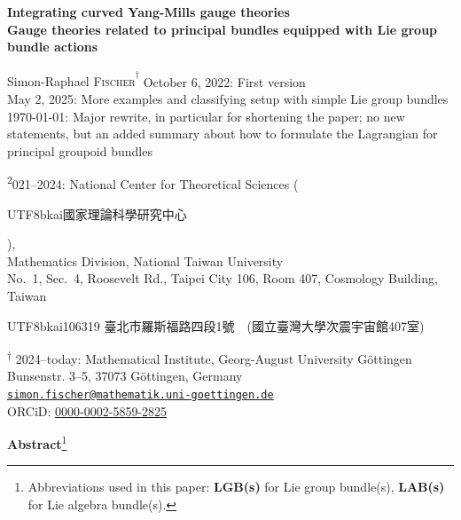 \documentclass[reqno,a4paper,oneside]{amsart}
\theoremstyle{plain}
\theoremstyle{remark}
\theoremstyle{definition}
\begin{document}
    \begin{titlepage}
        \vspace*{2cm}
        \begin{center}
            {{\LARGE \bf
                Integrating curved Yang-Mills gauge theories}
								\\[0.2cm]
								\bf Gauge theories related to principal bundles equipped with Lie group bundle actions
            }
            \vskip1cm
            {
						{\Large {Simon-Raphael \textsc{Fischer}\textsuperscript*\textsuperscript{$\dagger$}}}
						\vskip0.5cm
						October 6, 2022: First version \\ May 2, 2025: More examples and classifying setup with simple Lie group bundles \\ \today: Major rewrite, in particular for shortening the paper; no new statements, but an added summary about how to formulate the Lagrangian for principal groupoid bundles
            \vskip0.5cm
            {
                \textsuperscript* 2021–2024: National Center for Theoretical Sciences (\begin{CJK*}{UTF8}{bkai}國家理論科學研究中心\end{CJK*}),
								\\
								Mathematics Division,
								National Taiwan University
								\\
								No.\ 1, Sec.\ 4, Roosevelt Rd., Taipei City 106, Room 407, Cosmology Building, Taiwan
								\ \\
								\begin{CJK*}{UTF8}{bkai}106319 臺北市羅斯福路四段1號　(國立臺灣大學次震宇宙館407室)\end{CJK*}
								\vskip0.5cm
								\textsuperscript{$\dagger$} 2024–today: Mathematical Institute, Georg-August University Göttingen\\
                Bunsenstr. 3--5, 37073 Göttingen, Germany\\[0.3cm]
            {\href{mailto:simon.fischer@mathematik.uni-goettingen.de}{\texttt{simon.fischer@mathematik.uni-goettingen.de}}
						\\
						ORCiD: \href{https://orcid.org/0000-0002-5859-2825}{0000-0002-5859-2825}
						}
                }}
        \end{center}
        \vskip0.8cm
        \begin{center}
            \textbf{Abstract}\footnote{Abbreviations used in this paper: \textbf{LGB(s)} for Lie group bundle(s), \textbf{LAB(s)} for Lie algebra bundle(s).}
        \end{center}

\end{titlepage}
\end{document}
